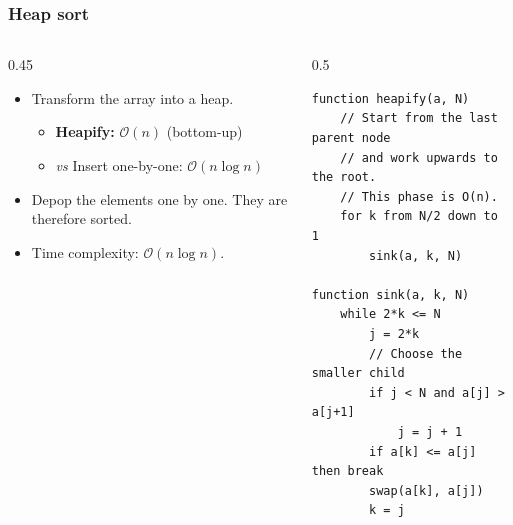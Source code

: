 \documentclass[8pt,aspectratio=169]{beamer}
\begin{document}
\begin{frame}[fragile]
\frametitle{Heap sort}

\begin{columns}[T]
    \begin{column}{0.45\textwidth}
        \begin{itemize}
            \item Transform the array into a heap.
            \begin{itemize}
                \item \textbf{Heapify:} $\mathcal{O}(n)$ (bottom-up)
                \item \textit{vs} Insert one-by-one: $\mathcal{O}(n\log n)$
            \end{itemize}
            \item Depop the elements one by one. They are therefore sorted.
            \item Time complexity: $\mathcal{O}(n\log n)$.
        \end{itemize}
    \end{column}

    \begin{column}{0.5\textwidth}
    \begin{lstlisting}[basicstyle=\tiny\ttfamily, frame=single]
function heapify(a, N)
    // Start from the last parent node
    // and work upwards to the root.
    // This phase is O(n).
    for k from N/2 down to 1
        sink(a, k, N)

function sink(a, k, N)
    while 2*k <= N
        j = 2*k
        // Choose the smaller child
        if j < N and a[j] > a[j+1]
            j = j + 1
        if a[k] <= a[j] then break
        swap(a[k], a[j])
        k = j
    \end{lstlisting}
    \end{column}
\end{columns}
\end{frame}
\end{document}
